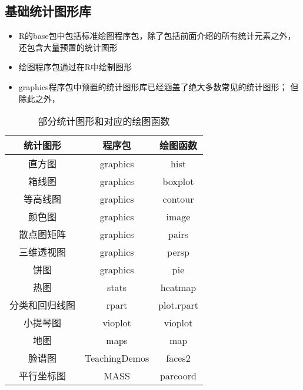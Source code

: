 \subsection{基础统计图形库}
\begin{frame}[t]{\subsecname}{}
\begin{itemize}
\item R的base包中包括标准绘图程序包，除了包括前面介绍的所有统计元素之外，
还包含大量预置的统计图形
\item 绘图程序包通过在R中绘制图形
\item graphics程序包中预置的统计图形库已经涵盖了绝大多数常见的统计图形；
但除此之外，
\end{itemize}
\end{frame}

\begin{frame}{\subsecname}{}
\begin{table} \centering \footnotesize
  \begin{tabular}{|c|c|c|}
    \toprule
    \rowcolor{LightCyan}
    统计图形 & 程序包 & 绘图函数\\\hline
    直方图 & graphics & hist\\\hline
    箱线图 & graphics & boxplot\\\hline
    等高线图 & graphics & contour\\\hline
    颜色图 & graphics & image\\\hline
    散点图矩阵 & graphics & pairs \\\hline
    三维透视图 & graphics & persp\\\hline
    饼图 & graphics & pie \\\hline
    热图 & stats & heatmap\\\hline
    分类和回归线图 & rpart & plot.rpart\\\hline
    小提琴图 & vioplot & vioplot \\\hline
    地图 & maps & map\\\hline
    脸谱图 & TeachingDemos & faces2\\\hline
    平行坐标图 & MASS & parcoord \\
    \bottomrule
  \end{tabular}
  \caption{部分统计图形和对应的绘图函数}
\end{table}  
\end{frame}

